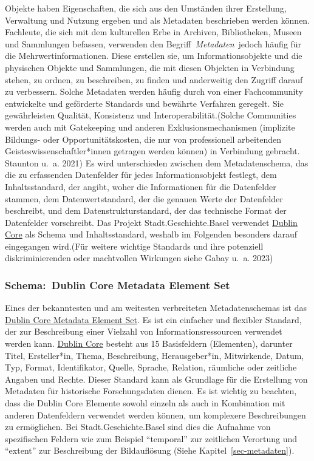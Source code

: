 \documentclass[
  letterpaper,
  DIV=11,
  numbers=noendperiod]{scrartcl}
\begin{document}
Objekte haben Eigenschaften, die sich aus den Umständen ihrer
Erstellung, Verwaltung und Nutzung ergeben und als Metadaten beschrieben
werden können. Fachleute, die sich mit dem kulturellen Erbe in Archiven,
Bibliotheken, Museen und Sammlungen befassen, verwenden den
Begriff~\emph{Metadaten}~jedoch häufig für die Mehrwertinformationen.
Diese erstellen sie, um Informationsobjekte und die physischen Objekte
und Sammlungen, die mit diesen Objekten in Verbindung stehen, zu ordnen,
zu beschreiben, zu finden und anderweitig den Zugriff darauf zu
verbessern. Solche Metadaten werden häufig durch von einer Fachcommunity
entwickelte und geförderte Standards und bewährte Verfahren geregelt.
Sie gewährleisten Qualität, Konsistenz und Interoperabilität.(Solche
Communities werden auch mit Gatekeeping und anderen
Exklusionsmechanismen (implizite Bildungs- oder Opportunitätskosten, die
nur von professionell arbeitenden Geisteswissenschaftler*innen getragen
werden können) in Verbindung gebracht. Staunton u.~a. 2021) Es wird
unterschieden zwischen dem Metadatenschema, das die zu erfassenden
Datenfelder für jedes Informationsobjekt festlegt, dem Inhaltsstandard,
der angibt, woher die Informationen für die Datenfelder stammen, dem
Datenwertstandard, der die genauen Werte der Datenfelder beschreibt, und
dem Datenstrukturstandard, der das technische Format der Datenfelder
vorschreibt. Das Projekt Stadt.Geschichte.Basel verwendet
\href{https://www.dublincore.org}{Dublin Core} als Schema und
Inhaltsstandard, weshalb im Folgenden besonders darauf eingegangen
wird.(Für weitere wichtige Standards und ihre potenziell
diskriminierenden oder machtvollen Wirkungen siehe Gabay u.~a. 2023)

\subsubsection{Schema:~Dublin Core Metadata Element
Set}\label{schema-dublin-core-metadata-element-set}

Eines der bekanntesten und am weitesten verbreiteten Metadatenschemas
ist das
\href{https://www.dublincore.org/specifications/dublin-core/dces/}{Dublin
Core Metadata Element Set}. Es ist ein einfacher und flexibler Standard,
der zur Beschreibung einer Vielzahl von Informationsressourcen verwendet
werden kann. \href{https://www.dublincore.org}{Dublin Core} besteht aus
15 Basisfeldern (Elementen), darunter Titel, Ersteller*in, Thema,
Beschreibung, Herausgeber*in, Mitwirkende, Datum, Typ, Format,
Identifikator, Quelle, Sprache, Relation, räumliche oder zeitliche
Angaben und Rechte. Dieser Standard kann als Grundlage für die
Erstellung von Metadaten für historische Forschungsdaten dienen. Es ist
wichtig zu beachten, dass die Dublin Core Elemente sowohl einzeln als
auch in Kombination mit anderen Datenfeldern verwendet werden können, um
komplexere Beschreibungen zu ermöglichen. Bei Stadt.Geschichte.Basel
sind dies die Aufnahme von spezifischen Feldern wie zum Beispiel
``temporal'' zur zeitlichen Verortung und ``extent'' zur Beschreibung
der Bildauflösung (Siehe Kapitel~\ref{sec-metadaten}).
\end{document}

